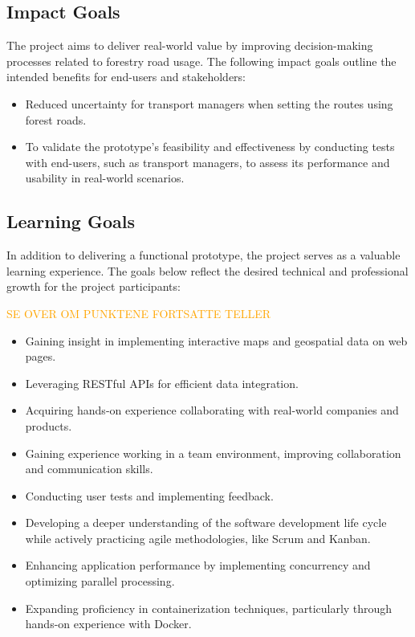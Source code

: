 \subsection{Impact Goals}\label{subsec:req:impactgoals}

The project aims to deliver real-world value by improving decision-making processes related to forestry road usage. The following impact goals outline the intended benefits for end-users and stakeholders:

\begin{itemize}
    \item Reduced uncertainty for transport managers when setting the routes using forest roads.
    \item To validate the prototype's feasibility and effectiveness by conducting tests with end-users, such as transport managers, to assess its performance and usability in real-world scenarios.
\end{itemize}

\subsection{Learning Goals}\label{subsec:req:learninggoals}

In addition to delivering a functional prototype, the project serves as a valuable learning experience. The goals below reflect the desired technical and professional growth for the project participants:

\textcolor{orange}{SE OVER OM PUNKTENE FORTSATTE TELLER}

\begin{itemize}
    \item Gaining insight in implementing interactive maps and geospatial data on web pages.
    \item Leveraging RESTful APIs for efficient data integration.
    \item Acquiring hands-on experience collaborating with real-world companies and products.
    \item Gaining experience working in a team environment, improving collaboration and communication skills.
    \item Conducting user tests and implementing feedback. 
    \item Developing a deeper understanding of the software development life cycle while actively practicing agile methodologies, like Scrum and Kanban.
    \item Enhancing application performance by implementing concurrency and optimizing parallel processing.
    \item Expanding proficiency in containerization techniques, particularly through hands-on experience with Docker.
\end{itemize}

